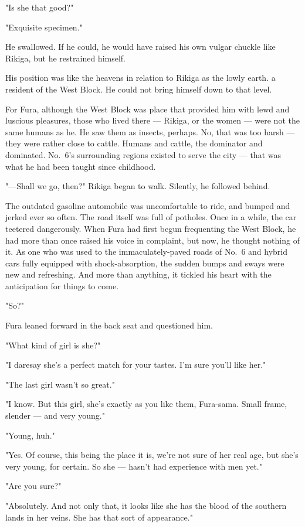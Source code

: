 "Is she that good?"

"Exquisite specimen."

He swallowed. If he could, he would have raised his own vulgar chuckle
like Rikiga, but he restrained himself.

His position was like the heavens in relation to Rikiga as the lowly
earth. a resident of the West Block. He could not bring himself down to
that level.

For Fura, although the West Block was place that provided him with lewd
and luscious pleasures, those who lived there --- Rikiga, or the women ---
were not the same humans as he. He saw them as insects, perhaps. No,
that was too harsh --- they were rather close to cattle. Humans and
cattle, the dominator and dominated. No.~6's surrounding regions existed
to serve the city --- that was what he had been taught since childhood.

"---Shall we go, then?" Rikiga began to walk. Silently, he followed
behind.

\mybreak

The outdated gasoline automobile was uncomfortable to ride, and bumped
and jerked ever so often. The road itself was full of potholes. Once in
a while, the car teetered dangerously. When Fura had first begun
frequenting the West Block, he had more than once raised his voice in
complaint, but now, he thought nothing of it. As one who was used to the
immaculately-paved roads of No.~6 and hybrid cars fully equipped with
shock-absorption, the sudden bumps and sways were new and refreshing.
And more than anything, it tickled his heart with the anticipation for
things to come.

"So?"

Fura leaned forward in the back seat and questioned him.

"What kind of girl is she?"

"I daresay she's a perfect match for your tastes. I'm sure you'll like
her."

"The last girl wasn't so great."

"I know. But this girl, she's exactly as you like them, Fura-sama. Small
frame, slender --- and very young."

"Young, huh."

"Yes. Of course, this being the place it is, we're not sure of her real
age, but she's very young, for certain. So she --- hasn't had experience
with men yet."

"Are you sure?"

"Absolutely. And not only that, it looks like she has the blood of the
southern lands in her veins. She has that sort of appearance."

